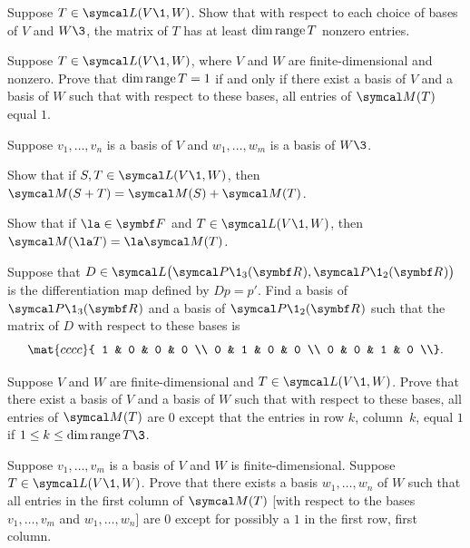 \begin{exercises}

\exercise
Suppose $T \in \L(V\1, W)$. Show that with respect to each choice of bases of $V$ and $W\3$, the matrix of $T$ has at least $\dim \operatorname{range} T$ nonzero entries.


\exercise
Suppose $T \in \L(V\1, W)$, where $V$ and $W$ are finite-dimensional and nonzero. Prove that $\dim \operatorname{range} T = 1$ if and only if there exist a basis of $V$ and a basis of $W$ such that with respect to these bases, all entries of $\M(T)$ equal $1$.


\exercise
Suppose $v_1, \ldots, v_n$ is a basis of $V$ and $w_1, \ldots, w_m$ is a basis of $W\3$.
\begin{subtheorem}
\item
Show that if $S, T \in \L(V\1, W)$, then $\M(S+T) = \M(S) + \M(T)$.
\item
Show that if $\la \in \F{}$ and $T \in \L(V\1, W)$, then $\M(\la T) = \la \M(T)$.
\end{subtheorem}


\exercise
Suppose that $D \in \L\bigl(\P\1_3(\R{}), \P\1_2(\R{}) \bigr)$ is the differentiation map defined by \mbox{$Dp = p'\!$}. Find a basis of $\P\1_3(\R{})$ and a basis of $\P\1_2(\R{})$ such that the matrix of $D$ with respect to these bases is
\[
\mat{cccc}{
1 & 0 & 0 & 0 \\
0 & 1 & 0 & 0 \\
0 & 0 & 1 & 0 \\}.
\]
\vspace{-.15in}


\exercise
Suppose $V$ and $W$ are finite-dimensional and $T \in \L(V\1, W)$. Prove that there exist a basis of $V$ and a basis of $W$ such that with respect to these bases, all entries of $\M(T)$ are $0$ except that the entries in row $k$, column~$k$, equal $1$ if $1 \le k \le \dim \ran T\3$. \label{zeroonematrix}


\exercise
Suppose $v_1, \dots, v_m$ is a basis of $V$ and $W$ is finite-dimensional. Suppose $T \in \L(V\1, W)$. Prove that there exists a basis $w_1, \dots, w_n$ of $W$ such that all entries in the first column of $\M(T)$ [with respect to the bases $v_1, \dots, v_m$ and $w_1, \dots, w_n$] are $0$ except for possibly a $1$ in the first row, first column.



\end{exercises}
